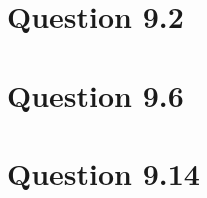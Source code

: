 \documentclass{article}
\begin{document}
\section*{Question 9.2}
\section*{Question 9.6}
\section*{Question 9.14}
\end{document}
